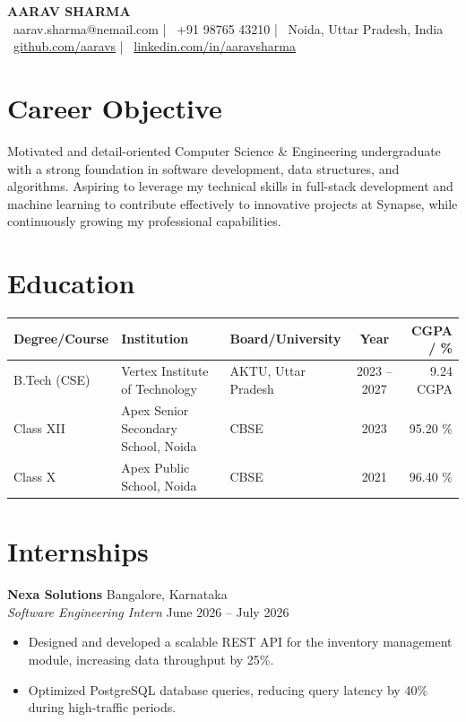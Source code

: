 \documentclass[a4paper,10pt]{article}
\begin{document}
\pagestyle{empty}

\begin{center}
    {\Huge\bfseries\color{primarycolor} AARAV SHARMA} \\
    \vspace{1mm}
    {\small\color{subtlecolor}
    \faEnvelope~aarav.sharma@nemail.com \quad | \quad 
    \faPhone~+91 98765 43210 \quad | \quad 
    \faMapMarker~Noida, Uttar Pradesh, India \\
    \vspace{0.8mm}
    \faGithub~\href{https://github.com/aaravs}{github.com/aaravs} \quad | \quad 
    \faLinkedin~\href{https://linkedin.com/in/aaravsharma}{linkedin.com/in/aaravsharma}
    }
\end{center}

\vspace{-4mm}

\section*{Career Objective}
\noindent
Motivated and detail-oriented Computer Science \& Engineering undergraduate with a strong foundation in software development, data structures, and algorithms. Aspiring to leverage my technical skills in full-stack development and machine learning to contribute effectively to innovative projects at Synapse, while continuously growing my professional capabilities.

\section*{Education}
\noindent
\begin{tabularx}{\textwidth}{@{}l X X c r@{}}
\toprule
\textbf{Degree/Course} & \textbf{Institution} & \textbf{Board/University} & \textbf{Year} & \textbf{CGPA / \%} \\
\midrule
B.Tech (CSE) & Vertex Institute of Technology & AKTU, Uttar Pradesh & 2023 -- 2027 & 9.24 CGPA \\
Class XII & Apex Senior Secondary School, Noida & CBSE & 2023 & 95.20 \% \\
Class X & Apex Public School, Noida & CBSE & 2021 & 96.40 \% \\
\bottomrule
\end{tabularx}

\section*{Internships}
\noindent
\textbf{Nexa Solutions} \hfill Bangalore, Karnataka \\
\textit{Software Engineering Intern} \hfill June 2026 -- July 2026
\begin{itemize}
    \item Designed and developed a scalable REST API for the inventory management module, increasing data throughput by 25\%.
    \item Optimized PostgreSQL database queries, reducing query latency by 40\% during high-traffic periods.
\end{itemize}
\end{document}
